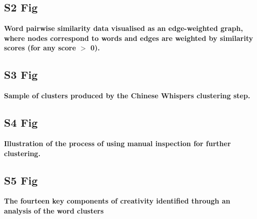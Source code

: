 \documentclass[10pt,letterpaper]{article}
\begin{document}
\subsection*{S2 Fig}\label{S2_Fig}
{\bf Word pairwise similarity data visualised as an edge-weighted graph, where nodes  correspond to words and edges are weighted by similarity scores (for any score $>$ 0). } 

\subsection*{S3 Fig}
\label{S3_Fig}
{\bf Sample of clusters produced by the Chinese Whispers clustering step.}

\subsection*{S4 Fig}
\label{S4_Fig}
{\bf Illustration of the process of using manual inspection for further clustering.}

\subsection*{S5 Fig}
\label{S5_Fig}
{\bf The fourteen key components of creativity identified through an analysis of the word clusters}
\end{document}
